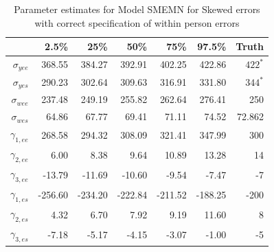 \documentclass[11pt]{article}\usepackage[]{graphicx}\usepackage[]{color}
\begin{document}
\begin{table}[ht]
\centering
\begin{tabular}{rrrrrr|r}
  \hline
 & 2.5\% & 25\% & 50\% & 75\% & 97.5\% & Truth\\
  \hline
  $\sigma_{yee}$ & 368.55 & 384.27 & 392.91 & 402.25 & 422.86 & $422^*$ \\ 
  $\sigma_{yes}$ & 290.23 & 302.64 & 309.63 & 316.91 & 331.80 & $344^*$\\ 
  $\sigma_{wee}$ & 237.48 & 249.19 & 255.82 & 262.64 & 276.41 & 250 \\ 
  $\sigma_{wes}$ & 64.86 & 67.77 & 69.41 & 71.11 & 74.52 & 72.862\\ 
  $\gamma_{1,ee}$ & 268.58 & 294.32 & 308.09 & 321.41 & 347.99 & 300\\ 
  $\gamma_{2,ee}$ & 6.00 & 8.38 & 9.64 & 10.89 & 13.28 & 14 \\ 
  $\gamma_{3,ee}$ & -13.79 & -11.69 & -10.60 & -9.54 & -7.47 & -7 \\ 
  $\gamma_{1,es}$ & -256.60 & -234.20 & -222.84 & -211.52 & -188.25 & -200 \\ 
  $\gamma_{2,es}$ & 4.32 & 6.70 & 7.92 & 9.19 & 11.60 & 8 \\ 
  $\gamma_{3,es}$ & -7.18 & -5.17 & -4.15 & -3.07 & -1.00 & -5\\ 
   \hline
\end{tabular}
\caption{Parameter estimates for Model SMEMN for Skewed errors with correct specification of within person errors}
\label{mSMEMNwpestimates}
\end{table}
\end{document}
